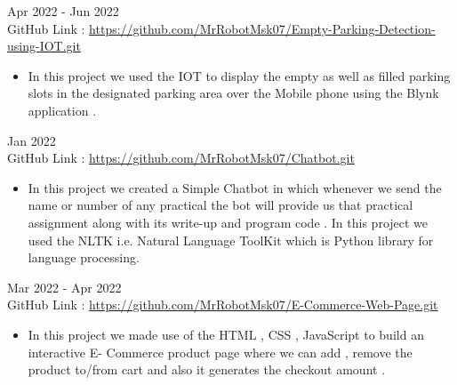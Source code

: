 \documentclass[letterpaper,10pt]{memoir} %
\begin{document}


{Apr 2022 - Jun 2022}\\
{GitHub Link : \href{https://github.com/MrRobotMsk07/Empty-Parking-Detection-using-IOT.git}{https://github.com/MrRobotMsk07/Empty-Parking-Detection-using-IOT.git}}
\begin{itemize}
    \item In this project we used the IOT to display the empty as well as filled parking slots in          the designated parking area over the Mobile phone using the Blynk application .\\
\end{itemize}
\clearpage %

\framebreak
\framebreak

\Sep


{Jan 2022}\\
{GitHub Link : \href{https://github.com/MrRobotMsk07/Chatbot.git}
{https://github.com/MrRobotMsk07/Chatbot.git}}
\begin{itemize}
    \item In this project we created a Simple Chatbot in which whenever we send the name or number of any practical the bot will provide us that practical assignment along with its write-up and program code . In this project we used the NLTK i.e. Natural Language ToolKit which is Python library for language processing.\\
\end{itemize}


{Mar 2022 - Apr 2022}\\
{GitHub Link : \href{https://github.com/MrRobotMsk07/E-Commerce-Web-Page.git}{https://github.com/MrRobotMsk07/E-Commerce-Web-Page.git}}
\begin{itemize}
    \item In this project we made use of the HTML , CSS , JavaScript to build an interactive E-            Commerce product page where we can add , remove the product to/from cart and also it             generates the checkout amount .\\
\end{itemize}
\end{document}
